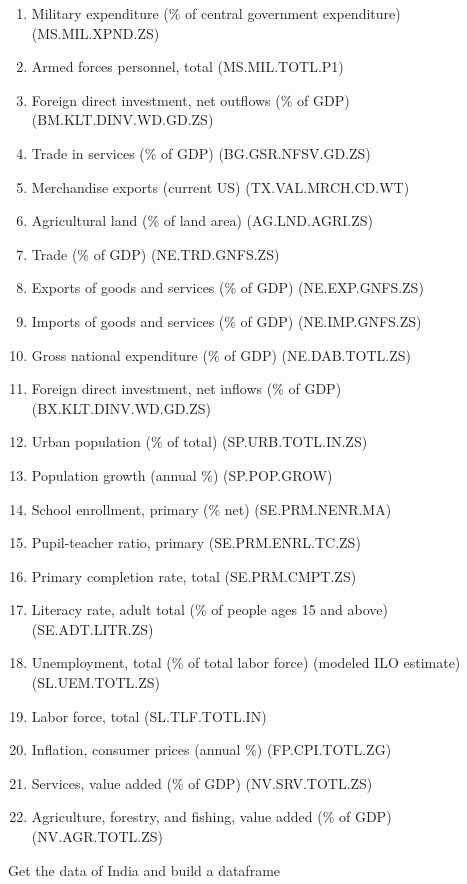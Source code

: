 \documentclass[11pt]{article}
\providecommand{\tightlist}{%
      \setlength{\itemsep}{0pt}\setlength{\parskip}{0pt}}
\begin{document}
\begin{enumerate}
\def\labelenumi{\arabic{enumi}.}
\tightlist
\item
  Military expenditure (\% of central government expenditure)
  (MS.MIL.XPND.ZS)
\item
  Armed forces personnel, total (MS.MIL.TOTL.P1)
\item
  Foreign direct investment, net outflows (\% of GDP)
  (BM.KLT.DINV.WD.GD.ZS)
\item
  Trade in services (\% of GDP) (BG.GSR.NFSV.GD.ZS)
\item
  Merchandise exports (current US) (TX.VAL.MRCH.CD.WT)
\item
  Agricultural land (\% of land area) (AG.LND.AGRI.ZS)
\item
  Trade (\% of GDP) (NE.TRD.GNFS.ZS)
\item
  Exports of goods and services (\% of GDP) (NE.EXP.GNFS.ZS)
\item
  Imports of goods and services (\% of GDP) (NE.IMP.GNFS.ZS)
\item
  Gross national expenditure (\% of GDP) (NE.DAB.TOTL.ZS)
\item
  Foreign direct investment, net inflows (\% of GDP)
  (BX.KLT.DINV.WD.GD.ZS)
\item
  Urban population (\% of total) (SP.URB.TOTL.IN.ZS)
\item
  Population growth (annual \%) (SP.POP.GROW)
\item
  School enrollment, primary (\% net) (SE.PRM.NENR.MA)
\item
  Pupil-teacher ratio, primary (SE.PRM.ENRL.TC.ZS)
\item
  Primary completion rate, total (SE.PRM.CMPT.ZS)
\item
  Literacy rate, adult total (\% of people ages 15 and above)
  (SE.ADT.LITR.ZS)
\item
  Unemployment, total (\% of total labor force) (modeled ILO estimate)
  (SL.UEM.TOTL.ZS)
\item
  Labor force, total (SL.TLF.TOTL.IN)
\item
  Inflation, consumer prices (annual \%) (FP.CPI.TOTL.ZG)
\item
  Services, value added (\% of GDP) (NV.SRV.TOTL.ZS)
\item
  Agriculture, forestry, and fishing, value added (\% of GDP)
  (NV.AGR.TOTL.ZS)
\end{enumerate}

    Get the data of India and build a dataframe
\end{document}
